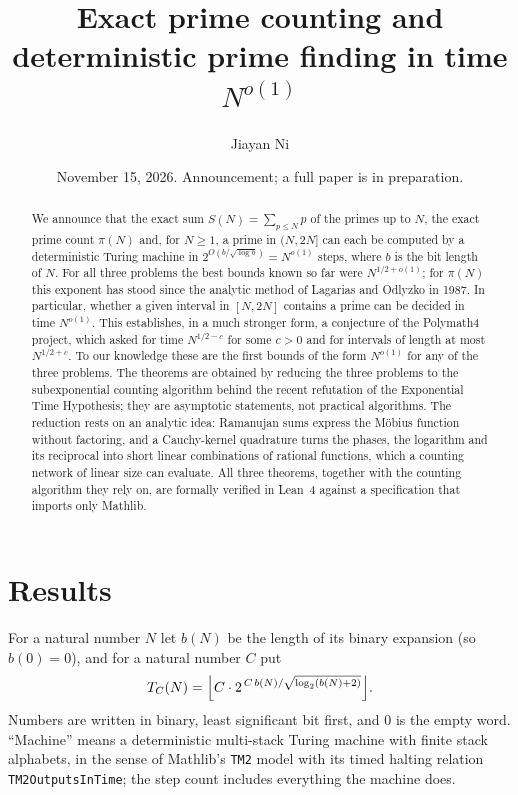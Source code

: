 \documentclass[11pt]{amsart}
\title[Prime counting and prime finding in time $N^{o(1)}$]%
{Exact prime counting and deterministic prime finding in time $N^{o(1)}$}
\author{Jiayan Ni}
\date{November 15, 2026. Announcement; a full paper is in preparation.}
\theoremstyle{remark}
\newcommand{\lean}[1]{\texttt{#1}}
\begin{document}
\begin{abstract}
We announce that the exact sum $S(N)=\sum_{p\le N}p$ of the primes up to
$N$, the exact prime count $\pi(N)$ and, for $N\ge1$, a prime in $(N,2N]$
can each be computed by a deterministic Turing machine in
$2^{O(b/\sqrt{\log b})}=N^{o(1)}$ steps, where $b$ is the bit length of $N$.
For all three problems the best bounds known so far were $N^{1/2+o(1)}$;
for $\pi(N)$ this exponent has stood since the analytic method of Lagarias
and Odlyzko in 1987.  In particular, whether a given interval in $[N,2N]$
contains a prime can be decided in time $N^{o(1)}$.  This establishes, in a
much stronger form, a conjecture of the Polymath4 project, which asked for
time $N^{1/2-c}$ for some $c>0$ and for intervals of length at most
$N^{1/2+c}$.  To our knowledge
these are the first bounds of the form $N^{o(1)}$ for any of the three
problems.  The theorems are obtained by reducing the three problems to the
subexponential counting algorithm behind the recent refutation of the
Exponential Time Hypothesis; they are asymptotic statements, not practical
algorithms.  The reduction rests on an analytic idea: Ramanujan sums express
the M\"obius function without factoring, and a Cauchy-kernel quadrature
turns the phases, the logarithm and its reciprocal into short linear
combinations of rational functions, which a counting network of linear size
can evaluate.  All three theorems, together with the counting algorithm they
rely on, are formally verified in Lean~4 against a specification that
imports only Mathlib.
\end{abstract}

\maketitle

\section{Results}

For a natural number $N$ let $b(N)$ be the length of its binary expansion
(so $b(0)=0$), and for a natural number $C$ put
\[
  T_C(N)=\Bigl\lfloor C\cdot 2^{\,C\,b(N)/\sqrt{\log_2(b(N)+2)}}\Bigr\rfloor .
\]
Numbers are written in binary, least significant bit first, and $0$ is the
empty word.  ``Machine'' means a deterministic multi-stack Turing machine
with finite stack alphabets, in the sense of Mathlib's \lean{TM2} model with
its timed halting relation \lean{TM2OutputsInTime}; the step count includes
everything the machine does.
\end{document}
